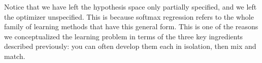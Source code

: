 \begin{center}
\end{center}
Notice that we have left the hypothesis space only partially specified, and we left the optimizer unspecified. This is because softmax regression refers to the whole family of learning methods that have this general form. This is one of the reasons we conceptualized the learning problem in terms of the three key ingredients described previously: you can often develop them each in isolation, then mix and match.



